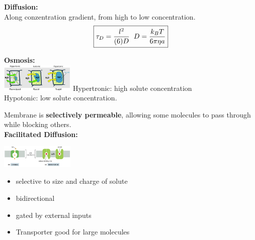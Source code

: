 
\begin{minipage}{0.5\linewidth}
    \textbf{Diffusion:}\\
    Along conzentration gradient, from high to low concentration.
        \[
    \boxed{        
            \tau_D = \frac{l^2}{(6)D} 
            \hspace{2mm}
            D = \frac{k_B T}{6 \pi \eta a}
    }
    \]
    \vspace{7mm}
\end{minipage}
\begin{minipage}{0.5\linewidth}
    \textbf{Osmosis:}\\
        \includegraphics[width=35mm]{src/Images/osmosis.png}
        Hypertronic: high solute concentration\\
        Hypotonic: low solute concentration.\\
\end{minipage}

Membrane is \textbf{selectively permeable}, allowing some molecules to pass through while blocking others.\\

\textbf{Facilitated Diffusion:}\\
\begin{minipage}{0.42\linewidth}
    \includegraphics[width=35mm]{src/Images/channel.png}
\end{minipage}
\begin{minipage}{0.58 \linewidth}
    \begin{itemize}
        \item selective to size and charge of solute
        \item bidirectional
        \item gated by external inputs
        \item Transporter good for large molecules
    \end{itemize}
\end{minipage}